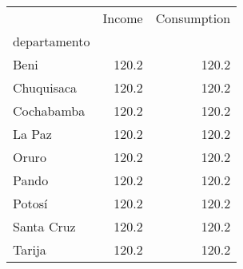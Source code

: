 \begin{tabular}{lrr}
\toprule
{} &  Income &  Consumption \\
departamento &         &              \\
\midrule
Beni         &   120.2 &        120.2 \\
Chuquisaca   &   120.2 &        120.2 \\
Cochabamba   &   120.2 &        120.2 \\
La Paz       &   120.2 &        120.2 \\
Oruro        &   120.2 &        120.2 \\
Pando        &   120.2 &        120.2 \\
Potosí       &   120.2 &        120.2 \\
Santa Cruz   &   120.2 &        120.2 \\
Tarija       &   120.2 &        120.2 \\
\bottomrule
\end{tabular}
